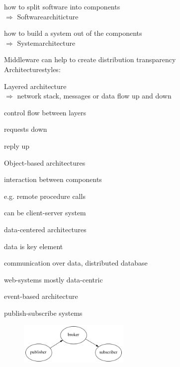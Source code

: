 \documentclass[ngerman,a4paper]{report}
\begin{document}
\begin{compactitem}
\item how to split software into components\\
$\Rightarrow$ Softwarearchiticture
\item how to build a system out of the components\\
$\Rightarrow$ Systemarchitecture
\end{compactitem}

Middleware can  help to create distribution transparency\\

Architecturestyles:\\
\begin{compactitem}
\item Layered architecture\\
$\Rightarrow$ network stack, messages or data flow up and down\\
\begin{compactitem}
\item control flow between layers
\item requests down
\item reply up
\end{compactitem}
\item Object-based architectures\\
\begin{compactitem}
\item interaction between components
\item e.g. remote procedure calls
\item can be client-server system
\end{compactitem}
\item data-centered architectures\\
\begin{compactitem}
\item data is key element
\item communication over data, distributed database
\item web-systems mostly data-centric
\end{compactitem}
\item event-based architecture\\
\begin{compactitem}
\item publish-subscribe systems
\begin{figure}[h]
	\centering
	\includegraphics[width=200px]{gfx/pub_sub.png}

\end{figure}
\end{compactitem}
\end{compactitem}
\end{document}
